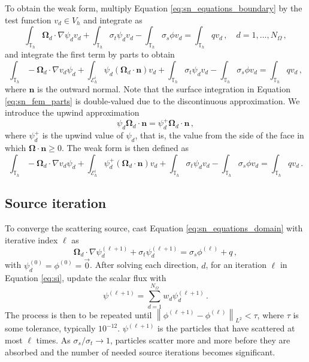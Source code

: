 \documentclass{article}
\newcommand{\vo}{\mathbf{\Omega}} %
\newcommand{\vn}{\mathbf{n}} %
\begin{document}
To obtain the weak form, multiply Equation \eqref{eq:sn_equations_boundary} by the test function $v_d \in V_h$ and integrate as
\begin{equation}
	\int_{\mathbb{T}_h} \vo_d \cdot \nabla \psi_d v_d + \int_{\mathbb{T}_h} \sigma_t \psi_d v_d - \int_{\mathbb{T}_h} \sigma_s \phi v_d = \int_{\mathbb{T}_h} qv_d\,, \quad d = 1, \ldots, N_\Omega\,,
\end{equation}
and integrate the first term by parts to obtain
\begin{equation}
	\label{eq:sn_fem_parts}
	\int_{\mathbb{T}_h} -\vo_d \cdot \nabla v_d\psi_d + \int_{\mathcal{E}_h^i} \psi_d (\vo_d \cdot \vn) v_d + \int_{\mathbb{T}_h} \sigma_t \psi_d v_d - \int_{\mathbb{T}_h} \sigma_s \phi v_d = \int_{\mathbb{T}_h} qv_d\,,
\end{equation}
where $\vn$ is the outward normal. Note that the surface integration in Equation \eqref{eq:sn_fem_parts} is double-valued due to the discontinuous approximation. We introduce the upwind approximation
\begin{equation}
	\psi_d \vo_d \cdot \vn = \psi^+_d \vo_d \cdot \vn\,,
\end{equation}
where $\psi_d^+$ is the upwind value of $\psi_d$, that is, the value from the side of the face in which $\vo \cdot \vn \geq 0$. The weak form is then defined as
\begin{equation}
	\label{eq:sn_fem_upwind}
	\int_{\mathbb{T}_h} -\vo_d \cdot \nabla v_d\psi_d + \int_{\mathcal{E}_h^i} \psi_d^+ (\vo_d \cdot \vn) v_d + \int_{\mathbb{T}_h} \sigma_t \psi_d v_d - \int_{\mathbb{T}_h} \sigma_s \phi v_d = \int_{\mathbb{T}_h} qv_d\,.
\end{equation}

\subsection{Source iteration}

To converge the scattering source, cast Equation \eqref{eq:sn_equations_domain} with iterative index $\ell$ as
\begin{equation}
	\label{eq:si}
\vo_d \cdot \nabla \psi_d^{(\ell + 1)} + \sigma_t \psi_d^{(\ell + 1)} = \sigma_s \phi^{(\ell)} + q\,,
\end{equation}
with $\psi_d^{(0)} = \phi^{(0)} = \vec{0}$. After solving each direction, $d$, for an iteration $\ell$ in Equation \eqref{eq:si}, update the scalar flux with
\begin{equation}
	\label{eq:si_update}
	\psi^{(\ell + 1)} = \sum_{d = 1}^{N_\Omega} w_d \psi_d^{(\ell + 1)}\,.
\end{equation}
The process is then to be repeated until $\left\lVert\phi^{(\ell + 1)} - \phi^{(\ell)}\right\rVert_{L^2} < \tau$, where $\tau$ is some tolerance, typically $10^{-12}$. $\psi^{(\ell + 1)}$ is the particles that have scattered at most $\ell$ times. As $\sigma_s / \sigma_t \to 1$, particles scatter more and more before they are absorbed and the number of needed source iterations becomes significant.
\end{document}
